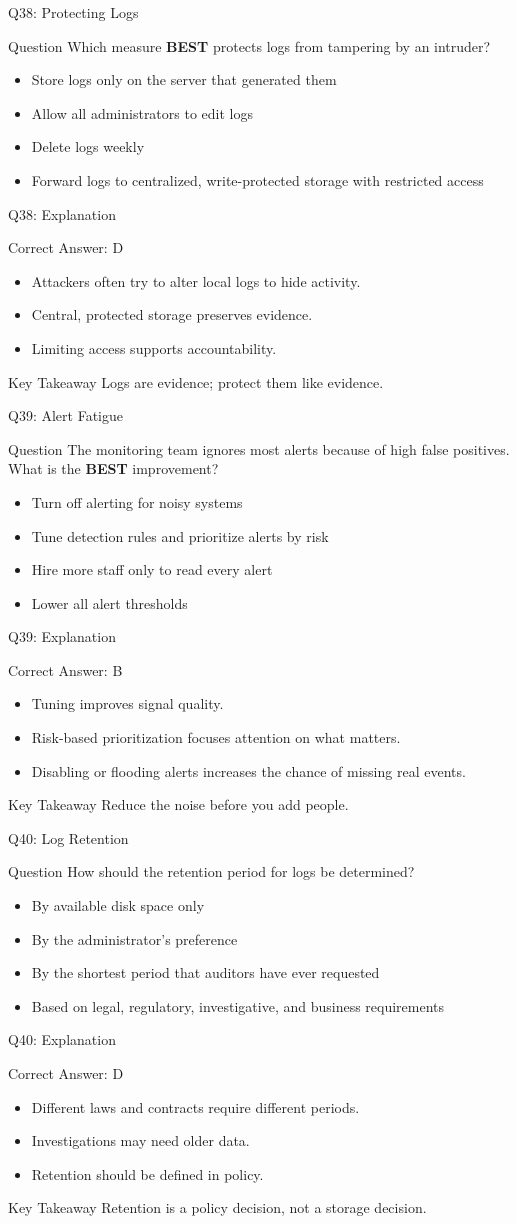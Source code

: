 \documentclass[aspectratio=169]{beamer}
\newcommand{\hq}[7]{%
	\begin{frame}{Q#1: #2}
		\begin{block}{Question}
			#3
		\end{block}
		\begin{itemize}
			#4
		\end{itemize}
	\end{frame}
	\begin{frame}{Q#1: Explanation}
		\begin{block}{Correct Answer: #5}
			\begin{itemize}
				#6
			\end{itemize}
		\end{block}
		\begin{alertblock}{Key Takeaway}
			#7
		\end{alertblock}
	\end{frame}
}
\begin{document}
	\hq{38}{Protecting Logs}
	{Which measure \textbf{BEST} protects logs from tampering by an intruder?}
	{\item[\textbf{(A)}] Store logs only on the server that generated them
		\item[\textbf{(B)}] Allow all administrators to edit logs
		\item[\textbf{(C)}] Delete logs weekly
		\item[\textbf{(D)}] Forward logs to centralized, write-protected storage with restricted access}
	{D}
	{\item Attackers often try to alter local logs to hide activity.
		\item Central, protected storage preserves evidence.
		\item Limiting access supports accountability.}
	{Logs are evidence; protect them like evidence.}
	
	\hq{39}{Alert Fatigue}
	{The monitoring team ignores most alerts because of high false positives. What is the \textbf{BEST} improvement?}
	{\item[\textbf{(A)}] Turn off alerting for noisy systems
		\item[\textbf{(B)}] Tune detection rules and prioritize alerts by risk
		\item[\textbf{(C)}] Hire more staff only to read every alert
		\item[\textbf{(D)}] Lower all alert thresholds}
	{B}
	{\item Tuning improves signal quality.
		\item Risk-based prioritization focuses attention on what matters.
		\item Disabling or flooding alerts increases the chance of missing real events.}
	{Reduce the noise before you add people.}
	
	\hq{40}{Log Retention}
	{How should the retention period for logs be determined?}
	{\item[\textbf{(A)}] By available disk space only
		\item[\textbf{(B)}] By the administrator's preference
		\item[\textbf{(C)}] By the shortest period that auditors have ever requested
		\item[\textbf{(D)}] Based on legal, regulatory, investigative, and business requirements}
	{D}
	{\item Different laws and contracts require different periods.
		\item Investigations may need older data.
		\item Retention should be defined in policy.}
	{Retention is a policy decision, not a storage decision.}
	
\end{document}
